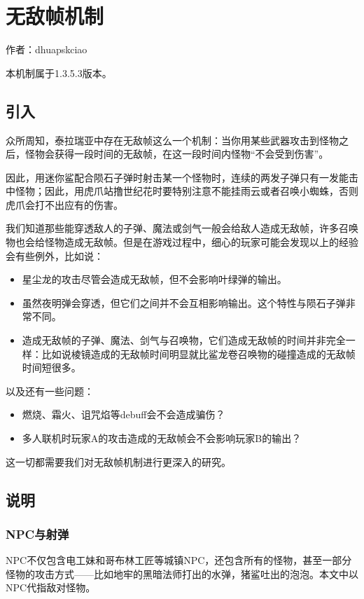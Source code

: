 \chapter{无敌帧机制}
\begin{center}
作者：dhuapskciao
\end{center}

\begin{note}
本机制属于1.3.5.3版本。
\end{note}

\section{引入}
众所周知，泰拉瑞亚中存在无敌帧这么一个机制：当你用某些武器攻击到怪物之后，怪物会获得一段时间的无敌帧，在这一段时间内怪物“不会受到伤害”。

因此，用迷你鲨配合陨石子弹时射击某一个怪物时，连续的两发子弹只有一发能击中怪物；因此，用虎爪站撸世纪花时要特别注意不能挂雨云或者召唤小蜘蛛，否则虎爪会打不出应有的伤害。

我们知道那些能穿透敌人的子弹、魔法或剑气一般会给敌人造成无敌帧，许多召唤物也会给怪物造成无敌帧。但是在游戏过程中，细心的玩家可能会发现以上的经验会有些例外，比如说：
\begin{itemize}
\item 星尘龙的攻击尽管会造成无敌帧，但不会影响叶绿弹的输出。
\item 虽然夜明弹会穿透，但它们之间并不会互相影响输出。这个特性与陨石子弹非常不同。
\item 造成无敌帧的子弹、魔法、剑气与召唤物，它们造成无敌帧的时间并非完全一样：比如说棱镜造成的无敌帧时间明显就比鲨龙卷召唤物的碰撞造成的无敌帧时间短很多。
\end{itemize}

以及还有一些问题：
\begin{itemize}
\item 燃烧、霜火、诅咒焰等debuff会不会造成骗伤？
\item 多人联机时玩家A的攻击造成的无敌帧会不会影响玩家B的输出？
\end{itemize}

这一切都需要我们对无敌帧机制进行更深入的研究。

\section{说明}
\subsection{NPC与射弹}
NPC不仅包含电工妹和哥布林工匠等城镇NPC，还包含所有的怪物，甚至一部分怪物的攻击方式——比如地牢的黑暗法师打出的水弹，猪鲨吐出的泡泡。本文中以NPC代指敌对怪物。

